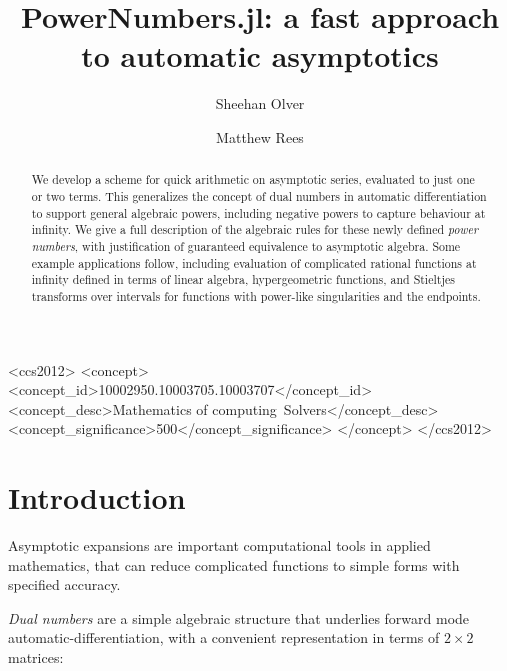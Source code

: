 \documentclass[acmsmall]{acmart}
\begin{document}
	
\title{PowerNumbers.jl: a fast approach to automatic asymptotics}

\author{Sheehan Olver}

\author{Matthew Rees}

\begin{abstract}
	We develop a scheme for quick arithmetic on asymptotic series, evaluated to just one or two terms. This generalizes the concept of dual numbers in automatic differentiation to support general algebraic powers, including negative powers to capture behaviour at infinity.  We give a full description of the algebraic rules for these newly defined {\it power numbers}, with justification of guaranteed equivalence to asymptotic algebra. Some example applications follow, including evaluation of complicated rational functions at infinity defined in terms of linear algebra, hypergeometric functions, and Stieltjes transforms over intervals for functions with power-like singularities and the endpoints.
\end{abstract}

\begin{CCSXML}
	<ccs2012>
	<concept>
	<concept_id>10002950.10003705.10003707</concept_id>
	<concept_desc>Mathematics of computing~Solvers</concept_desc>
	<concept_significance>500</concept_significance>
	</concept>
	</ccs2012>
\end{CCSXML}



\maketitle

\section{Introduction}

Asymptotic expansions are important computational tools in applied mathematics, that can reduce complicated functions to simple forms with specified accuracy. 

{\it Dual numbers} are a simple algebraic structure that underlies forward mode automatic-differentiation, with a convenient representation in terms of $2 \times 2$ matrices:
\end{document}
